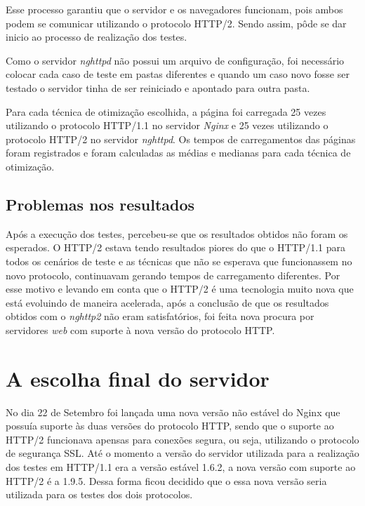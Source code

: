 Esse processo garantiu que o servidor e os navegadores funcionam, pois ambos podem se comunicar utilizando o protocolo HTTP/2. Sendo assim, pôde se dar inicio ao processo de realização dos testes.

Como o servidor \textit{nghttpd} não possui um arquivo de configuração, foi necessário colocar cada caso de teste em pastas diferentes e quando um caso novo fosse ser testado o servidor tinha de ser reiniciado e apontado para outra pasta.

Para cada técnica de otimização escolhida, a página foi carregada 25 vezes utilizando o protocolo HTTP/1.1 no servidor \textit{Nginx} e 25 vezes utilizando o protocolo HTTP/2 no servidor \textit{nghttpd}. Os tempos de carregamentos das páginas foram registrados e foram calculadas as médias e medianas para cada técnica de otimização.

\subsection{Problemas nos resultados}
\label{problemasnosresultados}

Após a execução dos testes, percebeu-se que os resultados obtidos não foram os esperados. O HTTP/2 estava tendo resultados piores do que o HTTP/1.1 para todos os cenários de teste e as técnicas que não se esperava que funcionassem no novo protocolo, continuavam gerando tempos de carregamento diferentes. Por esse motivo e levando em conta que o HTTP/2 é uma tecnologia muito nova que está evoluindo de maneira acelerada, após a conclusão de que os resultados obtidos com o \textit{nghttp2} não eram satisfatórios, foi feita nova procura por servidores \textit{web} com suporte à nova versão do protocolo HTTP.

\section{A escolha final do servidor}
\label{aescolhafinaldoservidor}


No dia 22 de Setembro foi lançada uma nova versão não estável do Nginx que possuía suporte às duas versões do protocolo HTTP, sendo que o suporte ao HTTP/2 funcionava apensas para conexões segura, ou seja, utilizando o protocolo de segurança SSL. Até o momento a versão do servidor utilizada para a realização dos testes em HTTP/1.1 era a versão estável 1.6.2, a nova versão com suporte ao HTTP/2 é a 1.9.5. Dessa forma ficou decidido que o essa nova versão seria utilizada para os testes dos dois protocolos.

